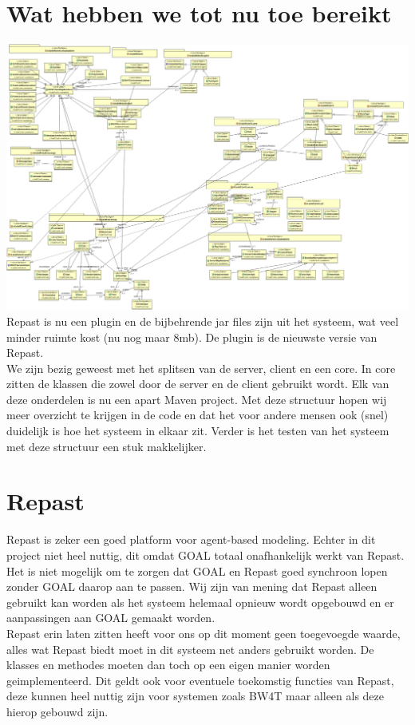 \documentclass[11pt,a4paper]{article}
\begin{document}
\section{Wat hebben we tot nu toe bereikt}
\includegraphics[width=\linewidth]{UMLv2.png}
Repast is nu een plugin en de bijbehrende jar files zijn uit het systeem, wat veel minder ruimte kost (nu nog maar 8mb). De plugin is de nieuwste versie van Repast. \\
We zijn bezig geweest met het splitsen van de server, client en een core. In core zitten de klassen die zowel door de server en de client gebruikt wordt. Elk van deze onderdelen is nu een apart Maven project. Met deze structuur hopen wij meer overzicht te krijgen in de code en dat het voor andere mensen ook (snel) duidelijk is hoe het systeem in elkaar zit. Verder is het testen van het systeem met deze structuur een stuk makkelijker. 

\section{Repast}
Repast is zeker een goed platform voor agent-based modeling. Echter in dit project niet heel nuttig, dit omdat GOAL totaal onafhankelijk werkt van Repast. Het is niet mogelijk om te zorgen dat GOAL en Repast goed synchroon lopen zonder GOAL daarop aan te passen. Wij zijn van mening dat Repast alleen gebruikt kan worden als het systeem helemaal opnieuw wordt opgebouwd en er aanpassingen aan GOAL gemaakt worden. \\
Repast erin laten zitten heeft voor ons op dit moment geen toegevoegde waarde, alles wat Repast biedt moet in dit systeem net anders gebruikt worden. De klasses en methodes moeten dan toch op een eigen manier worden geimplementeerd. Dit geldt ook voor eventuele toekomstig functies van Repast, deze kunnen heel nuttig zijn voor systemen zoals BW4T maar alleen als deze hierop gebouwd zijn.
\end{document}
